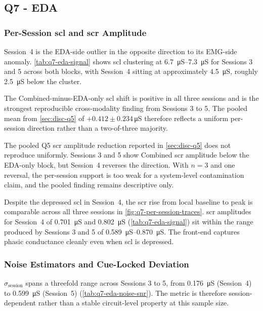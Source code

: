 \subsection{Q7 - EDA}
\label{sec:disc-q7-eda}

\subsubsection{Per-Session \gls{scl} and \gls{scr} Amplitude}
\label{sec:disc-q7-eda-scl-scr}

Session~4 is the EDA-side outlier in the opposite direction to its EMG-side anomaly. \autoref{tab:q7-eda-signal} shows \gls{scl} clustering at \SIrange{6.7}{7.3}{\micro\siemens} for Sessions 3 and 5 across both blocks, with Session~4 sitting at approximately \SI{4.5}{\micro\siemens}, roughly \SI{2.5}{\micro\siemens} below the cluster.

The Combined-minus-EDA-only \gls{scl} shift is positive in all three sessions and is the strongest reproducible cross-modality finding from Sessions 3 to 5. The pooled mean from \autoref{sec:disc-q5} of $+\num{0.412} \pm \num{0.234}$\,\si{\micro\siemens} therefore reflects a uniform per-session direction rather than a two-of-three majority.

The pooled Q5 \gls{scr} amplitude reduction reported in \autoref{sec:disc-q5} does not reproduce uniformly. Sessions 3 and 5 show Combined \gls{scr} amplitude below the EDA-only block, but Session~4 reverses the direction. With $n = 3$ and one reversal, the per-session support is too weak for a system-level contamination claim, and the pooled finding remains descriptive only.

Despite the depressed \gls{scl} in Session~4, the \gls{scr} rise from local baseline to peak is comparable across all three sessions in \autoref{fig:q7-per-session-traces}. \gls{scr} amplitudes for Session~4 of \SI{0.701}{\micro\siemens} and \SI{0.802}{\micro\siemens} (\autoref{tab:q7-eda-signal}) sit within the range produced by Sessions 3 and 5 of \SIrange{0.589}{0.870}{\micro\siemens}. The front-end captures phasic conductance cleanly even when \gls{scl} is depressed.

\subsubsection{Noise Estimators and Cue-Locked Deviation}
\label{sec:disc-q7-eda-noise-cuelocked}

$\sigma_\text{session}$ spans a threefold range across Sessions 3 to 5, from \SI{0.176}{\micro\siemens} (Session~4) to \SI{0.599}{\micro\siemens} (Session~5) (\autoref{tab:q7-eda-noise-snr}). The metric is therefore session-dependent rather than a stable circuit-level property at this sample size.

